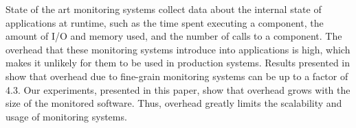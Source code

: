 %

State of the art monitoring systems \cite{FrenotS04,KregerHaroldWilliamson03,Binder200645} collect data about the internal state of applications at runtime, such as the time spent executing a component, the amount of I/O and memory used, and the number of calls to a component.
The overhead that these monitoring systems introduce into applications is high, which makes it unlikely for them to be used in production systems.
Results presented in \cite{Binder:2009:PPV:1464245.1464249} show that overhead due to fine-grain monitoring systems can be up to a factor of 4.3.
Our experiments, presented in this paper, show that overhead grows with the size of the monitored software.
Thus, overhead greatly limits the scalability and usage of monitoring systems.

